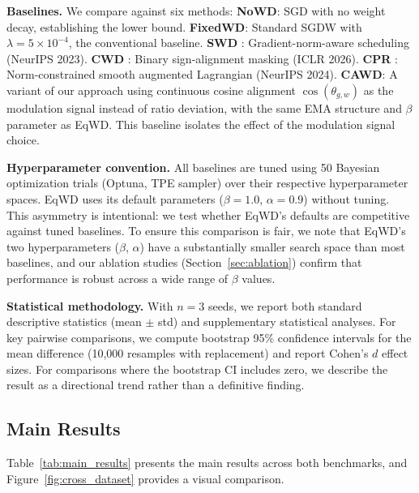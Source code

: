 \documentclass{article}
\begin{document}
\textbf{Baselines.} We compare against six methods:
\textbf{NoWD}: SGD with no weight decay, establishing the lower bound.
\textbf{FixedWD}: Standard SGDW with $\lambda = 5 \times 10^{-4}$, the conventional baseline.
\textbf{SWD} \citep{xie2023swd}: Gradient-norm-aware scheduling (NeurIPS 2023).
\textbf{CWD} \citep{chen2026cwd}: Binary sign-alignment masking (ICLR 2026).
\textbf{CPR} \citep{franke2024cpr}: Norm-constrained smooth augmented Lagrangian (NeurIPS 2024).
\textbf{CAWD}: A variant of our approach using continuous cosine alignment $\cos(\theta_{g,w})$ as the modulation signal instead of ratio deviation, with the same EMA structure and $\beta$ parameter as EqWD. This baseline isolates the effect of the modulation signal choice.

\textbf{Hyperparameter convention.} All baselines are tuned using 50
Bayesian optimization trials (Optuna, TPE sampler) over their respective
hyperparameter spaces. EqWD uses its default parameters
($\beta = 1.0$, $\alpha = 0.9$) without tuning. This asymmetry is
intentional: we test whether EqWD's defaults are competitive against
tuned baselines. To ensure this comparison is fair, we note that EqWD's
two hyperparameters ($\beta$, $\alpha$) have a substantially smaller
search space than most baselines, and our ablation studies (Section~\ref{sec:ablation})
confirm that performance is robust across a wide range of $\beta$
values.

\textbf{Statistical methodology.} With $n = 3$ seeds, we report both
standard descriptive statistics (mean $\pm$ std) and supplementary
statistical analyses. For key pairwise comparisons, we compute bootstrap
95\% confidence intervals for the mean difference (10,000 resamples with
replacement) and report Cohen's $d$ effect sizes. For comparisons
where the bootstrap CI includes zero, we describe the result as a
directional trend rather than a definitive finding.

\subsection{Main Results}
\label{sec:results}

Table~\ref{tab:main_results} presents the main results
across both benchmarks, and Figure~\ref{fig:cross_dataset} provides a visual comparison.
\end{document}
